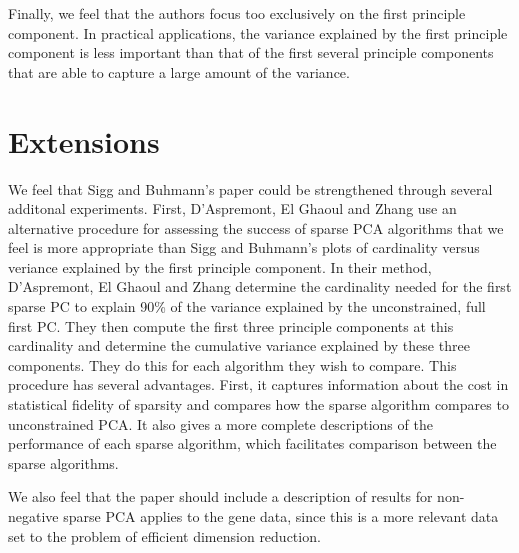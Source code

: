 \documentclass[twocolumn]{article}
\begin{document}
Finally, we feel that the authors focus too exclusively on
the first principle component.
In practical applications, the variance explained by the first
principle component is less important than that of the first
several principle components that are able to capture a large
amount of the variance.

\section{Extensions}

We feel that Sigg and Buhmann's paper could be strengthened
through several additonal experiments. First,
D'Aspremont, El Ghaoul and Zhang
use an alternative procedure for assessing the success of
sparse PCA algorithms that we feel is more appropriate than
Sigg and Buhmann's plots of cardinality versus veriance explained
by the first principle component.
In their method,
D'Aspremont, El Ghaoul and Zhang
determine the cardinality needed for the
first sparse PC to explain 90\% of the variance explained
by the unconstrained, full first PC.
They then compute the first three principle components at this
cardinality and determine the cumulative variance explained by
these three components. They do this for each algorithm they
wish to compare. This procedure has several advantages.
First, it captures information about the cost in statistical
fidelity of sparsity and compares how the sparse algorithm
compares to unconstrained PCA. It also gives a more complete
descriptions of the performance of each sparse algorithm, which
facilitates comparison between the sparse algorithms.

We also feel that the paper should include a description of
results for non-negative sparse PCA applies to the gene data,
since this is a more relevant data set to the problem of
efficient dimension reduction.
\end{document}
